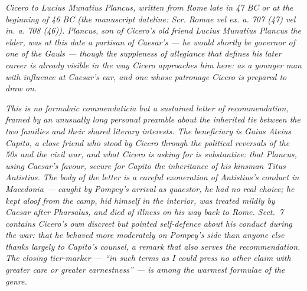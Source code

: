 
\textit{Cicero to Lucius Munatius Plancus, written from
Rome late in 47 BC or at the beginning of 46 BC (the
manuscript dateline: \textit{Scr. Romae vel ex. a. 707
(47) vel in. a. 708 (46)}). Plancus, son of Cicero's
old friend Lucius Munatius Plancus the elder, was at
this date a partisan of Caesar's --- he would shortly be
governor of one of the Gauls --- though the suppleness
of allegiance that defines his later career is already
visible in the way Cicero approaches him here: as a
younger man with influence at Caesar's ear, and one
whose patronage Cicero is prepared to draw on.}

\textit{This is no formulaic commendaticia but a sustained
letter of recommendation, framed by an unusually long
personal preamble about the inherited tie between the
two families and their shared literary interests. The
beneficiary is Gaius Ateius Capito, a close friend who
stood by Cicero through the political reversals of the
50s and the civil war, and what Cicero is asking for is
substantive: that Plancus, using Caesar's favour,
secure for Capito the inheritance of his kinsman Titus
Antistius. The body of the letter is a careful
exoneration of Antistius's conduct in Macedonia ---
caught by Pompey's arrival as quaestor, he had no real
choice; he kept aloof from the camp, hid himself in the
interior, was treated mildly by Caesar after Pharsalus,
and died of illness on his way back to Rome. Sect.~7
contains Cicero's own discreet but pointed
self-defence about his conduct during the war: that he
behaved more moderately on Pompey's side than anyone
else thanks largely to Capito's counsel, a remark that
also serves the recommendation. The closing tier-marker
--- ``in such terms as I could press no other claim
with greater care or greater earnestness'' --- is among
the warmest formulae of the genre.}
